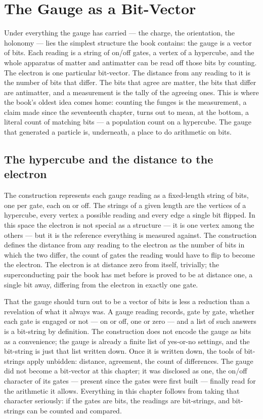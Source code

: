 \chapter{The Gauge as a Bit-Vector}
\label{chap:gauge-as-a-bit-vector}

Under everything the gauge has carried --- the charge, the orientation, the holonomy --- lies the
simplest structure the book contains: the gauge is a vector of bits. Each reading is a string of on/off
gates, a vertex of a hypercube, and the whole apparatus of matter and antimatter can be read off those
bits by counting. The electron is one particular bit-vector. The distance from any reading to it is the
number of bits that differ. The bits that agree are matter, the bits that differ are antimatter, and a
measurement is the tally of the agreeing ones. This is where the book's oldest idea comes home: counting
the funges is the measurement, a claim made since the seventeenth chapter, turns out to mean, at the
bottom, a literal count of matching bits --- a population count on a hypercube. The gauge that generated a
particle is, underneath, a place to do arithmetic on bits.

\section{The hypercube and the distance to the electron}
\label{se:the-hypercube-and-the-distance-to-the-electron}

The construction represents each gauge reading as a fixed-length string of bits, one per gate, each on or
off. The strings of a given length are the vertices of a hypercube, every vertex a possible reading and
every edge a single bit flipped. In this space the electron is not special as a structure --- it is one
vertex among the others --- but it is the reference everything is measured against. The construction
defines the distance from any reading to the electron as the number of bits in which the two differ, the
count of gates the reading would have to flip to become the electron. The electron is at distance zero
from itself, trivially; the superconducting pair the book has met before is proved to be at distance one,
a single bit away, differing from the electron in exactly one gate.

That the gauge should turn out to be a vector of bits is less a reduction than a revelation of what it
always was. A gauge reading records, gate by gate, whether each gate is engaged or not --- on or off, one
or zero --- and a list of such answers is a bit-string by definition. The construction does not encode the
gauge as bits as a convenience; the gauge is already a finite list of yes-or-no settings, and the
bit-string is just that list written down. Once it is written down, the tools of bit-strings apply
unbidden: distance, agreement, the count of differences. The gauge did not become a bit-vector at this
chapter; it was disclosed as one, the on/off character of its gates --- present since the gates were first
built --- finally read for the arithmetic it allows. Everything in this chapter follows from taking that
character seriously: if the gates are bits, the readings are bit-strings, and bit-strings can be counted
and compared.

